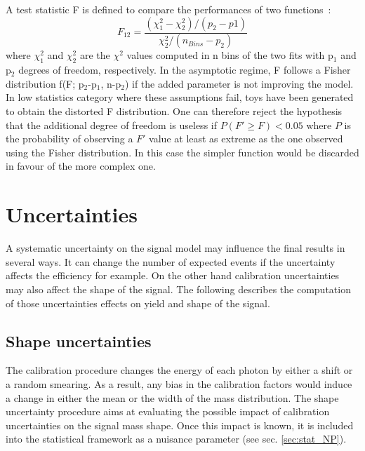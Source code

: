 \begin{enumerate}
A test statistic F is defined to compare the performances of two functions~:
\begin{equation}
F_{12} = \frac{(\chi^2_1 - \chi^2_2)/(p_2-p1)}{\chi^2_2/(n_{Bins}-p_2)}
\end{equation}
where \(\chi_{\text{1}}^{\text{2}}\) and \(\chi^{\text{2}}_{\text{2}}\) are the \(\chi^{\text{2}}\) values computed in n bins of the two fits with p\(_{\text{1}}\) and p\(_{\text{2}}\) degrees of freedom, respectively.
In the asymptotic regime, F follows a Fisher distribution f(F; p\(_{\text{2}}\)-p\(_{\text{1}}\), n-p\(_{\text{2}}\)) if the added parameter is not improving the model.
In low statistics category where these assumptions fail, toys have been generated to obtain the distorted F distribution.
One can therefore reject the hypothesis that the additional degree of freedom is useless if $P(F'\geq F)<0.05$ where $P$ is the probability of observing a $F'$ value at least as extreme as the one observed using the Fisher distribution.
In this case the simpler function would be discarded in favour of the more complex one.
\end{enumerate}

\section{Uncertainties}
\label{sec:orgc59f6d5}
\label{sec:HGam_shapeUncertainties}
A systematic uncertainty on the signal model may influence the final results in several ways.
It can change the number of expected events if the uncertainty affects the efficiency for example.
On the other hand calibration uncertainties may also affect the shape of the signal.
The following describes the computation of those uncertainties effects on yield and shape of the signal.


\subsection{Shape uncertainties}
\label{sec:org5a47e96}


The calibration procedure changes the energy of each photon by either a shift or a random smearing.
As a result, any bias in the calibration factors would induce a change in either the mean or the width of the mass distribution.
The shape uncertainty procedure aims at evaluating the possible impact of calibration uncertainties on the signal mass shape.
Once this impact is known, it is included into the statistical framework as a nuisance parameter (see sec. \ref{sec:stat_NP}).

